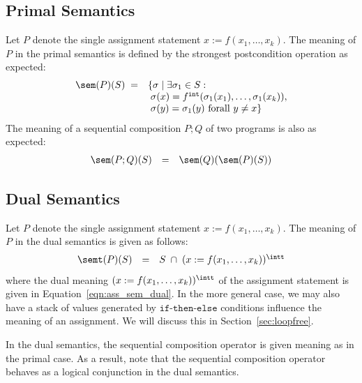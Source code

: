 \documentclass[preprint]{sig-alternate-05-2015}
\def\int{{\tt{int}}}
\def\ite{{\texttt{if-then-else}}}
\begin{document}
{\subsection{Primal Semantics}
Let $P$ denote the single assignment
statement $x := f(x_1,\ldots,x_k)$.
The meaning of $P$ in the primal semantics is defined by
the strongest postcondition operation as expected:
\[
  \begin{array}{rl}
    \sem(P)(S) \; = & \{ \sigma \mid \exists{\sigma_1\in S}:
            \\ &\;\sigma(x) = f^\int(\sigma_1(x_1),\ldots,\sigma_1(x_k)),
            \\ &\;\sigma(y) = \sigma_1(y) \mbox{ forall $y\neq x$}\}
\end{array}
\]
The meaning of a sequential composition $P;Q$ of two programs
is also as expected:
\[
  \begin{array}{rclcl}
    \sem(P;Q)(S) & = & \sem(Q)(\sem(P)(S))
\end{array}
\]

\subsection{Dual Semantics}
Let $P$ denote the single assignment
statement $x := f(x_1,\ldots,x_k)$.
The meaning of $P$ in the dual semantics is given as follows:
\[
  \begin{array}{rclcl}
    \semt(P)(S) & = & S \;\cap\;
      (x := f(x_1,\ldots,x_k))^\intt
\end{array}
\]
where the dual meaning
      $(x := f(x_1,\ldots,x_k))^\intt$
of the assignment statement
is given in Equation~\ref{eqn:ass_sem_dual}.
In the more general case, we may also
have a stack of values generated by
$\ite$ conditions influence the meaning of an assignment.
We will discuss this in Section~\ref{sec:loopfree}.

In the dual semantics, the sequential composition operator is
given meaning as in the primal case. As a result,
note that the sequential
composition operator behaves as a logical conjunction
in the dual semantics.

}
\end{document}
